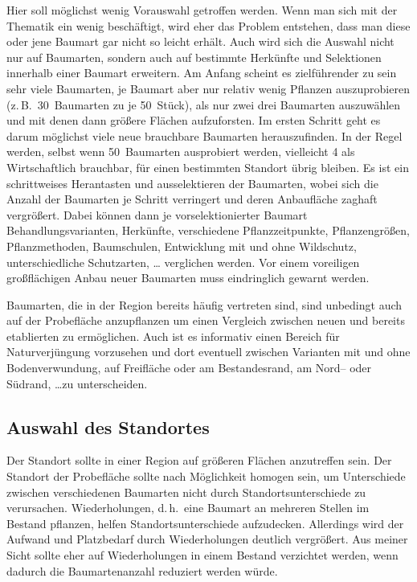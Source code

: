 \documentclass[twocolumn]{scrartcl}
\begin{document}
Hier soll möglichst wenig Vorauswahl getroffen werden. Wenn man sich mit der
Thematik ein wenig beschäftigt, wird eher das Problem entstehen, dass man diese
oder jene Baumart gar nicht so leicht erhält. Auch wird sich die Auswahl nicht
nur auf Baumarten, sondern auch auf bestimmte Herkünfte und Selektionen
innerhalb einer Baumart erweitern. Am Anfang scheint es zielführender zu sein
sehr viele Baumarten, je Baumart aber nur relativ wenig Pflanzen auszuprobieren
(z.\,B.\ 30~Baumarten zu je 50~Stück), als nur zwei drei Baumarten auszuwählen
und mit denen dann größere Flächen aufzuforsten. Im ersten Schritt geht es darum
möglichst viele neue brauchbare Baumarten herauszufinden. In der Regel werden,
selbst wenn 50~Baumarten ausprobiert werden, vielleicht 4 als Wirtschaftlich
brauchbar, für einen bestimmten Standort übrig bleiben. Es ist ein schrittweises
Herantasten und ausselektieren der Baumarten, wobei sich die Anzahl der
Baumarten je Schritt verringert und deren Anbaufläche zaghaft vergrößert. Dabei
können dann je vorselektionierter Baumart Behandlungsvarianten, Herkünfte,
verschiedene Pflanzzeitpunkte, Pflanzengrößen, Pflanzmethoden, Baumschulen,
Entwicklung mit und ohne Wildschutz, unterschiedliche Schutzarten, \dots
verglichen werden. Vor einem voreiligen großflächigen Anbau neuer Baumarten
muss eindringlich gewarnt werden.

Baumarten, die in der Region bereits häufig vertreten sind, sind unbedingt auch
auf der Probefläche anzupflanzen um einen Vergleich zwischen neuen und bereits
etablierten zu ermöglichen. Auch ist es informativ einen Bereich für
Naturverjüngung vorzusehen und dort eventuell zwischen Varianten mit und ohne
Bodenverwundung, auf Freifläche oder am Bestandesrand, am Nord-- oder Südrand,
\dots zu unterscheiden.

\subsection{Auswahl des Standortes}

Der Standort sollte in einer Region auf größeren Flächen anzutreffen sein. Der
Standort der Probefläche sollte nach Möglichkeit homogen sein, um Unterschiede
zwischen verschiedenen Baumarten nicht durch Standortsunterschiede zu
verursachen. Wiederholungen, d.\,h.\ eine Baumart an mehreren Stellen im Bestand
pflanzen, helfen Standortsunterschiede aufzudecken. Allerdings wird der Aufwand
und Platzbedarf durch Wiederholungen deutlich vergrößert. Aus meiner Sicht
sollte eher auf Wiederholungen in einem Bestand verzichtet werden, wenn dadurch
die Baumartenanzahl reduziert werden würde.
\end{document}
